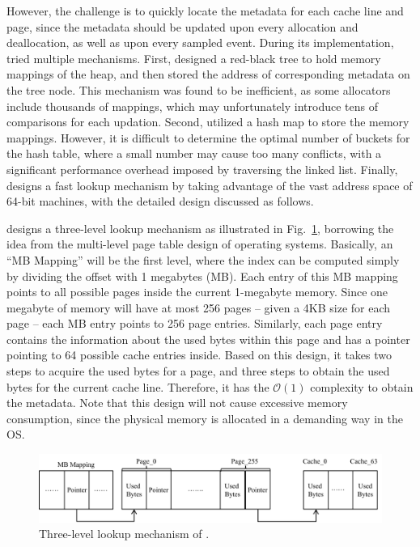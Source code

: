 However, the challenge is to quickly locate the metadata for each cache line and page, since the metadata should be updated upon every allocation and deallocation, as well as upon every sampled event. During its implementation, \MP{} tried multiple mechanisms. First, \MP{} designed a red-black tree to hold memory mappings of the heap, and then stored the address of corresponding metadata on the tree node. This mechanism was found to be inefficient, as some allocators include thousands of mappings, which may unfortunately introduce tens of comparisons for each updation. Second, \MP{} utilized a hash map to store the memory mappings. However, it is difficult to determine the optimal number of buckets for the hash table, where a small number may cause too many conflicts, with a significant performance overhead imposed by traversing the linked list. Finally, \MP{} designs a fast lookup mechanism by taking advantage of the vast address space of 64-bit machines, with the detailed design discussed as follows. 

\MP{} designs a three-level lookup mechanism as illustrated in Fig.~\ref{fig:lookup}, borrowing the idea from the multi-level page table design of operating systems. Basically, an ``MB Mapping'' will be the first level, where the index can be computed simply by dividing the offset with 1 megabytes (MB). Each entry of this MB mapping points to all possible pages inside the current 1-megabyte memory. Since one megabyte of memory will have at most 256 pages -- given a 4KB size for each page -- each MB entry points to 256 page entries. Similarly, each page entry contains the information about the used bytes within this page and has a pointer pointing to 64 possible cache entries inside. Based on this design, it takes two steps to acquire the used bytes for a page, and three steps to obtain the used bytes for the current cache line. Therefore, it has the $\mathcal{O}(1)$ 
complexity to obtain the metadata. Note that this design will not cause excessive memory consumption, since the physical memory is allocated in a demanding way in the OS. 
 
          
\begin{figure}[!h]
\centering
\includegraphics[width=0.9\columnwidth]{figures/lookup}
\caption{Three-level lookup mechanism of \MP{}.\label{fig:lookup}}
\end{figure}

